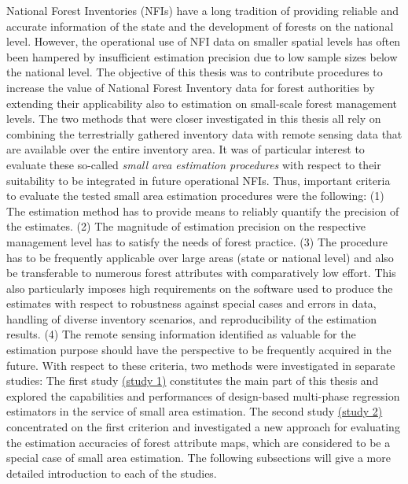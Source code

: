 National Forest Inventories (NFIs) have a long tradition of providing reliable and accurate information of the state and the development of forests on the national level. However, the operational use of NFI data on smaller spatial levels has often been hampered by insufficient estimation precision due to low sample sizes below the national level. The objective of this thesis was to contribute procedures to increase the value of National Forest Inventory data for forest authorities by extending their applicability also to estimation on small-scale forest management levels. The two methods that were closer investigated in this thesis all rely on combining the terrestrially gathered inventory data with remote sensing data that are available over the entire inventory area. It was of particular interest to evaluate these so-called \textit{small area estimation procedures} with respect to their suitability to be integrated in future operational NFIs. Thus, important criteria to evaluate the tested small area estimation procedures were the following: (1) The estimation method has to provide means to reliably quantify the precision of the estimates. (2) The magnitude of estimation precision on the respective management level has to satisfy the needs of forest practice. (3) The procedure has to be frequently applicable over large areas (state or national level) and also be transferable to numerous forest attributes with comparatively low effort. This also particularly imposes high requirements on the software used to produce the estimates with respect to robustness against special cases and errors in data, handling of diverse inventory scenarios, and reproducibility of the estimation results. (4) The remote sensing information identified as valuable for the estimation purpose should have the perspective to be frequently acquired in the future. With respect to these criteria, two methods were investigated in separate studies: The first study \hyperref[sec:study1]{(study 1)} constitutes the main part of this thesis and explored the capabilities and performances of design-based multi-phase regression estimators in the service of small area estimation. The second study \hyperref[sec:study2]{(study 2)} concentrated on the first criterion and investigated a new approach for evaluating the estimation accuracies of forest attribute maps, which are considered to be a special case of small area estimation. The following subsections will give a more detailed introduction to each of the studies.


